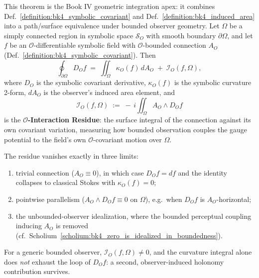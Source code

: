 \begin{theorem}
\label{theorem:bk4_symbolic_stokes}
This theorem is the Book IV geometric integration apex: it combines Def.~\ref{definition:bk4_symbolic_covariant} and Def.~\ref{definition:bk4_induced_area} into a path/surface equivalence under bounded observer geometry.
Let $\Omega$ be a simply connected region in symbolic space $\mathcal{S}_O$ with smooth boundary $\partial\Omega$, and let $f$ be an $\mathcal{O}$-differentiable symbolic field with $\mathcal{O}$-bounded connection $A_O$ (Def.~\ref{definition:bk4_symbolic_covariant}). Then
\[
\oint_{\partial\Omega} D_O f \;=\; \iint_\Omega \kappa_O(f)\, dA_O \;+\; \mathcal{I}_O(f,\Omega),
\]
where $D_O$ is the symbolic covariant derivative, $\kappa_O(f)$ is the symbolic curvature 2-form, $dA_O$ is the observer's induced area element, and
\[
\mathcal{I}_O(f,\Omega) \;:=\; -\, i \iint_\Omega A_O \wedge D_O f
\]
is the \textbf{$\mathcal{O}$-Interaction Residue}: the surface integral of the connection against its own covariant variation, measuring how bounded observation couples the gauge potential to the field's own $\mathcal{O}$-covariant motion over $\Omega$.

The residue vanishes exactly in three limits:
\begin{enumerate}
    \item trivial connection ($A_O \equiv 0$), in which case $D_O f = df$ and the identity collapses to classical Stokes with $\kappa_O(f) = 0$;
    \item pointwise parallelism ($A_O \wedge D_O f \equiv 0$ on $\Omega$), e.g.\ when $D_O f$ is $A_O$-horizontal;
    \item the unbounded-observer idealization, where the bounded perceptual coupling inducing $A_O$ is removed (cf.\ Scholium~\ref{scholium:bk4_zero_is_idealized_in_boundedness}).
\end{enumerate}
For a generic bounded observer, $\mathcal{I}_O(f,\Omega) \neq 0$, and the curvature integral alone does \emph{not} exhaust the loop of $D_O f$: a second, observer-induced holonomy contribution survives.
\end{theorem}

